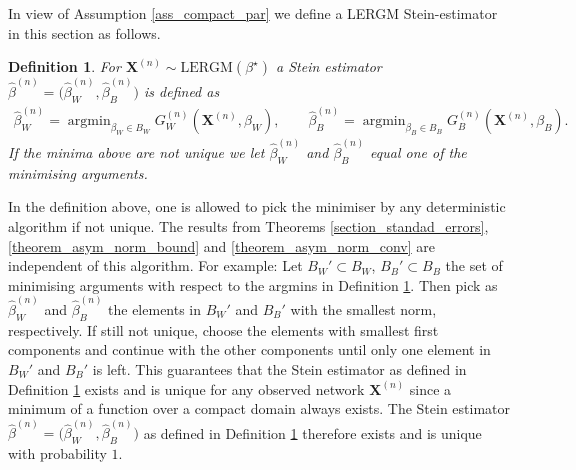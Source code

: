 \documentclass{article}
\newtheorem{Definition}[Theorem]{Definition}
\DeclareMathOperator*{\argmin}{argmin}
\begin{document}
In view of Assumption \ref{ass_compact_par} we define a LERGM Stein-estimator in this section as follows.
\begin{Definition} \label{definition_stein_est_conv_analysis}
    For $\mathbf{X}^{(n)}\sim \mathrm{LERGM}(\beta^{\star})$ a Stein estimator $\hat{\beta}^{(n)}= \big( \hat{\beta}_W^{(n)}, \hat{\beta}_B^{(n)} \big) $ is defined as
\begin{align*}
    \hat{\beta}_W^{(n)} = \argmin_{\beta_W \in B_W} G_W^{(n)}(\mathbf{X}^{(n)},\beta_W),  \qquad \hat{\beta}_B^{(n)} =  \argmin_{\beta_B \in B_B} G_B^{(n)}(\mathbf{X}^{(n)},\beta_B).
\end{align*}
If the minima above are not unique we let $\hat{\beta}_W^{(n)}$ and $\hat{\beta}_B^{(n)}$ equal one of the minimising arguments.
\end{Definition}
In the definition above, one is allowed to pick the minimiser by any deterministic algorithm if not unique. The results from Theorems \ref{section_standad_errors}, \ref{theorem_asym_norm_bound} and \ref{theorem_asym_norm_conv} are independent of this algorithm. For example: Let $B_W' \subset B_W$, $B_B' \subset B_B$ the set of minimising arguments with respect to the argmins in Definition \ref{definition_stein_est_conv_analysis}. Then pick as $\hat{\beta}_W^{(n)}$ and $\hat{\beta}_B^{(n)}$ the elements in $B_W'$ and $B_B'$ with the smallest norm, respectively. If still not unique, choose the elements with smallest first components and continue with the other components until only one element in $B_W'$ and $B_B'$ is left. This guarantees that the Stein estimator as defined in Definition \ref{definition_stein_est_conv_analysis} exists and is unique for any observed network $\mathbf{X}^{(n)}$ since a minimum of a function over a compact domain always exists. The Stein estimator $\hat{\beta}^{(n)}= \big( \hat{\beta}_W^{(n)}, \hat{\beta}_B^{(n)} \big) $ as defined in Definition \ref{definition_stein_est_conv_analysis} therefore exists and is unique with probability $1$.  \par
\end{document}
